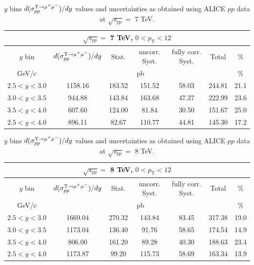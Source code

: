 \begin{table}[!tp]
\begin{center}
\begin{tabular}{|c||c|c|c|c|c|c|}
  \hline
  \multicolumn{7}{|c|}{$\sqrt{s_{pp}}=$ 7 TeV, $0<p_\mathrm{T}<12$}\\
  \hline
  $y$ bin & $d(\sigma_{pp}^{\Upsilon\rightarrow \mu^{+}\mu^{\--}})/dy $ & Stat. & uncorr. Syst. & fully corr. Syst. & Total & $\%$ \\
  \hline
  GeV/c & \multicolumn{5}{c|}{pb} & $\%$ \\
  \hline
  $2.5 < y < 3.0 $ & 1158.16 & 183.52 & 151.52 & 58.03 & 244.81 & 21.1 \\
  \hline
  $3.0 < y < 3.5 $& 944.88 & 143.84 & 163.68 & 47.37 & 222.99 & 23.6 \\
  \hline
  $3.5 < y < 4.0 $& 607.60 & 124.00 & 81.84 & 30.50 & 151.67 & 25.0 \\
  \hline
  $2.5 < y < 4.0 $& 896.11 & 82.67 & 110.77 & 44.81 & 145.30 & 17.2 \\
  \hline
\end{tabular}
\caption{$y$ bins $d(\sigma_{pp}^{\Upsilon\rightarrow \mu^{+}\mu^{\--}})/dy $ values and uncertainties as obtained using ALICE $pp$ data at $\sqrt{s_{pp}}=$ 7 TeV.}\label{table:ALICEY1sData7}
\end{center}
\end{table}

\begin{table}[!tp]
\begin{center}
\begin{tabular}{|c||c|c|c|c|c|c|}
  \hline
  \multicolumn{7}{|c|}{$\sqrt{s_{pp}}=$ 8 TeV, $0<p_\mathrm{T}<12$}\\
  \hline
  $y$ bin & $d(\sigma_{pp}^{\Upsilon\rightarrow \mu^{+}\mu^{\--}})/dy $ & Stat. & uncorr. Syst. & fully corr. Syst. & Total & $\%$ \\
  \hline
  GeV/c & \multicolumn{5}{c|}{pb} & $\%$ \\
  \hline
  $2.5 < y < 3.0 $ & 1669.04 & 270.32 & 143.84 & 83.45 & 317.38 & 19.0 \\
  \hline
  $3.0 < y < 3.5 $& 1173.04 & 136.40 & 91.76 & 58.65 & 174.54 & 14.9 \\
  \hline
  $3.5 < y < 4.0 $& 806.00 & 161.20 & 89.28 & 40.30 & 188.63 & 23.4 \\
  \hline
  $2.5 < y < 4.0 $& 1173.87 & 99.20 & 115.73 & 58.69 & 163.34 & 13.9 \\
  \hline
\end{tabular}
\caption{$y$ bins $d(\sigma_{pp}^{\Upsilon\rightarrow \mu^{+}\mu^{\--}})/dy $ values and uncertainties as obtained using ALICE $pp$ data at $\sqrt{s_{pp}}=$ 8 TeV.}\label{table:ALICEY1sData8}
\end{center}
\end{table}

